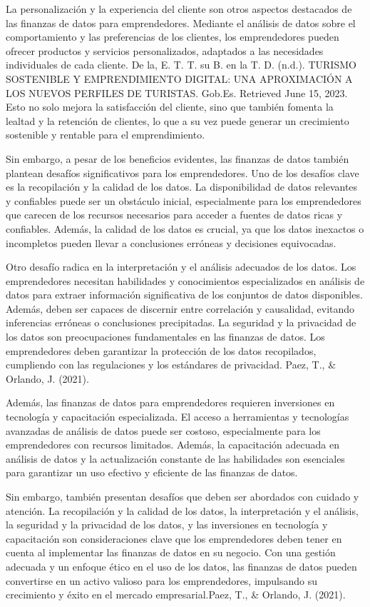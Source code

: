 \documentclass[
  letterpaper,
  DIV=11,
  numbers=noendperiod]{scrreprt}
\begin{document}
La personalización y la experiencia del cliente son otros aspectos
destacados de las finanzas de datos para emprendedores. Mediante el
análisis de datos sobre el comportamiento y las preferencias de los
clientes, los emprendedores pueden ofrecer productos y servicios
personalizados, adaptados a las necesidades individuales de cada
cliente. De la, E. T. T. su B. en la T. D. (n.d.). TURISMO SOSTENIBLE Y
EMPRENDIMIENTO DIGITAL: UNA APROXIMACIÓN A LOS NUEVOS PERFILES DE
TURISTAS. Gob.Es. Retrieved June 15, 2023. Esto no solo mejora la
satisfacción del cliente, sino que también fomenta la lealtad y la
retención de clientes, lo que a su vez puede generar un crecimiento
sostenible y rentable para el emprendimiento.

Sin embargo, a pesar de los beneficios evidentes, las finanzas de datos
también plantean desafíos significativos para los emprendedores. Uno de
los desafíos clave es la recopilación y la calidad de los datos. La
disponibilidad de datos relevantes y confiables puede ser un obstáculo
inicial, especialmente para los emprendedores que carecen de los
recursos necesarios para acceder a fuentes de datos ricas y confiables.
Además, la calidad de los datos es crucial, ya que los datos inexactos o
incompletos pueden llevar a conclusiones erróneas y decisiones
equivocadas.

Otro desafío radica en la interpretación y el análisis adecuados de los
datos. Los emprendedores necesitan habilidades y conocimientos
especializados en análisis de datos para extraer información
significativa de los conjuntos de datos disponibles. Además, deben ser
capaces de discernir entre correlación y causalidad, evitando
inferencias erróneas o conclusiones precipitadas. La seguridad y la
privacidad de los datos son preocupaciones fundamentales en las finanzas
de datos. Los emprendedores deben garantizar la protección de los datos
recopilados, cumpliendo con las regulaciones y los estándares de
privacidad. Paez, T., \& Orlando, J. (2021).

Además, las finanzas de datos para emprendedores requieren inversiones
en tecnología y capacitación especializada. El acceso a herramientas y
tecnologías avanzadas de análisis de datos puede ser costoso,
especialmente para los emprendedores con recursos limitados. Además, la
capacitación adecuada en análisis de datos y la actualización constante
de las habilidades son esenciales para garantizar un uso efectivo y
eficiente de las finanzas de datos.

Sin embargo, también presentan desafíos que deben ser abordados con
cuidado y atención. La recopilación y la calidad de los datos, la
interpretación y el análisis, la seguridad y la privacidad de los datos,
y las inversiones en tecnología y capacitación son consideraciones clave
que los emprendedores deben tener en cuenta al implementar las finanzas
de datos en su negocio. Con una gestión adecuada y un enfoque ético en
el uso de los datos, las finanzas de datos pueden convertirse en un
activo valioso para los emprendedores, impulsando su crecimiento y éxito
en el mercado empresarial.Paez, T., \& Orlando, J. (2021).
\end{document}
